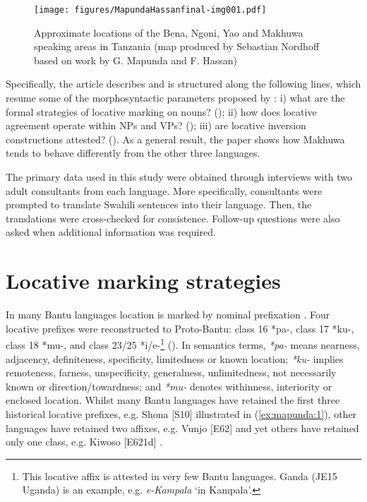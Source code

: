 \documentclass[output=paper ]{langscibook}
\begin{document}
  
\begin{figure}
\texttt{[image: figures/MapundaHassanfinal-img001.pdf]}
 

\caption{Approximate locations of the Bena, Ngoni, Yao and Makhuwa speaking areas in Tanzania (map produced by Sebastian Nordhoff based on work by G. Mapunda and F. Hassan)}
\label{fig:mapunda:1}
\end{figure}

Specifically, the article describes and is structured along the following lines, which resume some of the morphosyntactic parameters proposed by \citet{GuéroisEtAl2017}: i) what are the formal strategies of locative marking on nouns? (); ii) how does locative agreement operate within NPs and VPs? (); iii) are locative inversion constructions attested? (). As a general result, the paper shows how Makhuwa tends to behave differently from the other three languages. 

The primary data used in this study were obtained through interviews with two adult consultants from each language. More specifically, consultants were prompted to translate Swahili sentences into their language. Then, the translations were cross-checked for consistence. Follow-up questions were also asked when additional information was required.  

\section{Locative marking strategies}\label{sec:mapunda:2} %

In many Bantu languages location is marked by nominal prefixation \citep{Rugemalira2004}. Four locative prefixes were reconstructed to Proto-Bantu: class 16 \mbox{*pa-,} class 17 \mbox{*ku-,} class 18 \mbox{*mu-,} and class 23/25 *i/e-\footnote{{This locative affix is attested in very few Bantu languages. Ganda (JE15 Uganda) is an example, e.g.} {\textit{e-Kampala}} {‘in Kampala’.} } (\citealt{Bleek1862-69, Guthrie1948, Guthrie1967-1971, Meeussen1967}). In semantics terms, \textit{*pa-} means nearness, adjacency, definiteness, specificity, limitedness or known location; \textit{*ku-} implies  remoteness, farness, unspecificity, generalness, unlimitedness, not necessarily known or direction\slash to\-wardness; and \textit{*mu-} denotes withinness, interiority or enclosed location. Whilst many Bantu languages have retained the first three historical locative prefixes, e.g. Shona [S10] illustrated in (\ref{ex:mapunda:1}), other languages have retained two affixes, e.g. Vunjo [E62] \citep{Mcha1979} and yet others have retained only one class, e.g. Kiwoso [E621d] \citep{Mallya2011}. 
\end{document}

